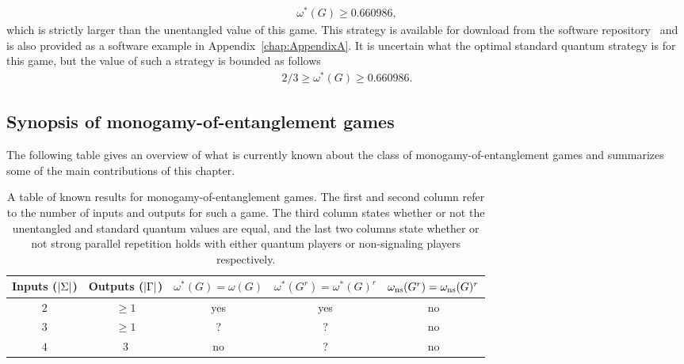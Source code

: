 \begin{example}
 	\begin{align} \label{eq:lb-MUB-4-3}
 		\omega^*(G) \geq 0.660986,
 	\end{align}
 	which is strictly larger than the unentangled value of this game. This strategy is available for download from the software repository~\cite{Johnston2015b} and is also provided as a software example in Appendix~\ref{chap:AppendixA}. 
	It is uncertain what the optimal standard quantum strategy is for this game, but the value of such a strategy is bounded as follows  
	\begin{align}
		2/3 \geq \omega^*(G) \geq 0.660986. 
	\end{align}

\end{example}

\subsection{Synopsis of monogamy-of-entanglement games}

The following table gives an overview of what is currently known about the class of monogamy-of-entanglement games and summarizes some of the main contributions of this chapter. 

\begin{table}[!htpb]
\centering
\def\arraystretch{1.5}
\begin{tabular}{|c|c|c|c|c|}
  \hline
    Inputs ($\left\lvert \Sigma \right\rvert$) & Outputs ($\left\lvert \Gamma \right\rvert$) & $\omega^*(G) = \omega(G)$ & $\omega^*(G^r) = \omega^*(G)^r$ & $\omega_{\textnormal{ns}}(G^r) = \omega_{\textnormal{ns}}(G)^r$  \\
  \hline \hline
  $2$ & $\geq 1$ & yes & yes\footnotemark & no \\
  \hline
  $3$ & $\geq 1$ & ? & ? & no \\
  \hline
  $4$ & $3$ & no & ? & no \\
  \hline
\end{tabular}
\caption[Results on monogamy-of-entanglement games.]{A table of known results for monogamy-of-entanglement games. The first and second column refer to the number of inputs and outputs for such a game. The third column states whether or not the unentangled and standard quantum values are equal, and the last two columns state whether or not strong parallel repetition holds with either quantum players or non-signaling players respectively.}
\label{table:results-monogamy-of-entanglement-games}
\end{table}

